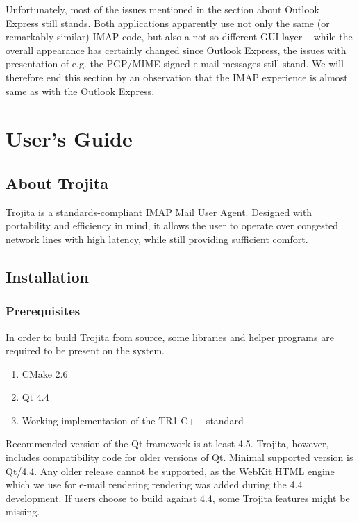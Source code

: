 \documentclass[12pt,notitlepage]{report}
\newcommand{\trojita}{Trojita\xspace}
\begin{document}
Unfortunately, most of the issues mentioned in the section about Outlook Express
still stands.  Both applications apparently use not only the same (or remarkably
similar) IMAP code, but also a not-so-different GUI layer -- while the overall
appearance has certainly changed since Outlook Express, the issues with
presentation of e.g. the PGP/MIME signed e-mail messages still stand.  We will
therefore end this section by an observation that the IMAP experience is almost
same as with the Outlook Express.

\chapter{User's Guide}
\label{users-guide}

\section{About Trojita}

\trojita is a standards-compliant IMAP Mail User Agent. Designed with portability
and efficiency in mind, it allows the user to operate over congested network
lines with high latency, while still providing sufficient comfort.

\section{Installation}

\subsection{Prerequisites}

In order to build \trojita from source, some libraries and helper programs are
required to be present on the system.

\begin{enumerate}
    \item{CMake 2.6}
    \item{Qt 4.4}
    \item{Working implementation of the TR1 C++ standard}
\end{enumerate}

Recommended version of the Qt framework \cite{qt} is at least 4.5. \trojita,
however, includes compatibility code for older versions of Qt. Minimal supported
version is Qt/4.4. Any older release cannot be supported, as the WebKit HTML
engine which we use for e-mail rendering rendering was added during the 4.4
development. If users choose to build against 4.4, some \trojita features might
be missing.
\end{document}

